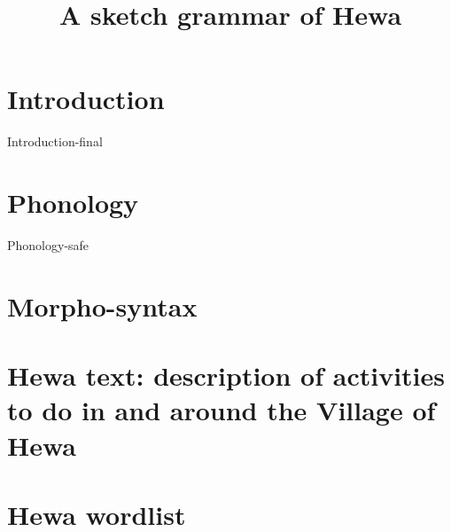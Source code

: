 \documentclass{article}
\title{A sketch grammar of Hewa}
\begin{document}

\section{Introduction}
{Introduction-final}

\section{Phonology}
{Phonology-safe}

\section{Morpho-syntax}

\appendix
\section{Hewa text: description of activities to do in and around the Village of Hewa}

\section{Hewa wordlist}

\printbibliography
\end{document}
